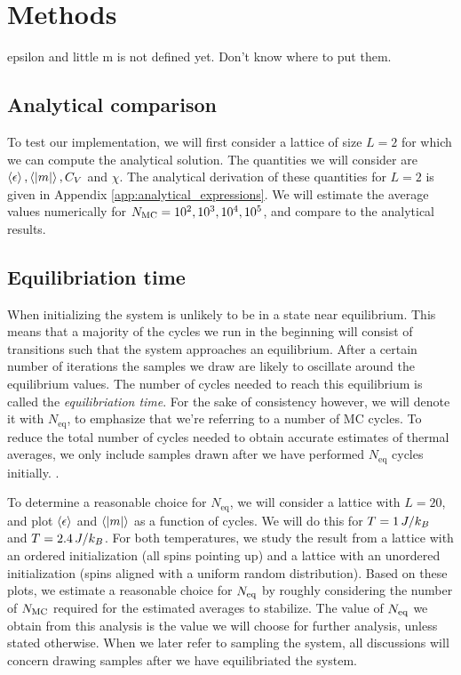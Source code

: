 \section{Methods}\label{sec:methods}
\alert{epsilon and little m is not defined yet. Don't know where to put them.}

\subsection{Analytical comparison}\label{subsec_methods:analytical_test}
To test our implementation, we will first consider a lattice of size $L=2$ for which we can compute the analytical solution. The quantities we will consider are $\expval{\epsilon},\expval{\abs{m}},C_V$ and $\chi$. The analytical derivation of these quantities for $L=2$ is given in Appendix \ref{app:analytical_expressions}. We will estimate the average values numerically for $N_\mathrm{MC}=10^2,10^3,10^4,10^5$, and compare to the analytical results.

\subsection{Equilibriation time}\label{subsec_methods:equilibriation_time}
When initializing the system is unlikely to be in a state near equilibrium. This means that a majority of the cycles we run in the beginning will consist of transitions such that the system approaches an equilibrium. After a certain number of iterations the samples we draw are likely to oscillate around the equilibrium values. The number of cycles needed to reach this equilibrium is called the \textit{equilibriation time}. For the sake of consistency however, we will denote it with $N_\mathrm{eq}$, to emphasize that we're referring to a number of MC cycles. To reduce the total number of cycles needed to obtain accurate estimates of thermal averages, we only include samples drawn after we have performed $N_\mathrm{eq}$ cycles initially. . 

To determine a reasonable choice for $N_\mathrm{eq}$, we will consider a lattice with $L=20$, and plot $\expval{\epsilon}$ and $\expval{\abs{m}}$ as a function of cycles. We will do this for $T=1\,J/k_B$ and $T=2.4\,J/k_B$. For both temperatures, we study the result from a lattice with an ordered initialization (all spins pointing up) and a lattice with an unordered initialization (spins aligned with a uniform random distribution). Based on these plots, we estimate a reasonable choice for $N_\mathrm{eq}$ by roughly considering the number of $N_\mathrm{MC}$ required for the estimated averages to stabilize. The value of $N_\mathrm{eq}$ we obtain from this analysis is the value we will choose for further analysis, unless stated otherwise. When we later refer to sampling the system, all discussions will concern drawing samples after we have equilibriated the system.     

